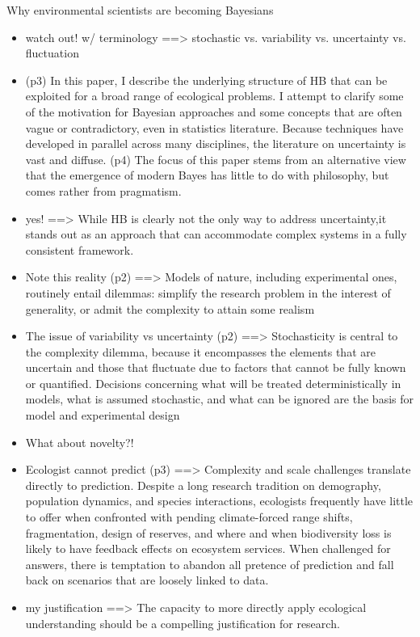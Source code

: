 \documentclass[twoside]{article}	                         %
\begin{document}
\noindent \citep{clark_why_2005} Why environmental scientists are becoming Bayesians
\begin{itemize}
  \item watch out! w/ terminology ==> stochastic vs. variability vs. uncertainty vs. fluctuation
  \item (p3) In this paper, I describe the underlying structure of HB that can be exploited for a broad range of ecological problems. I attempt to clarify some of the motivation for Bayesian approaches and some concepts that are often vague or contradictory, even in statistics literature. Because techniques have developed in parallel across many disciplines, the literature on uncertainty is vast and diffuse. (p4) The focus of this paper stems from an alternative view that the emergence of modern Bayes has little to do with philosophy, but comes rather from pragmatism.   
  \item yes! ==> While HB is clearly not the only way to address uncertainty,it stands out as an approach that can accommodate complex systems in a fully consistent framework.
  \item Note this reality (p2) ==> Models of nature, including experimental ones, routinely entail dilemmas: simplify the research problem in the interest of generality, or admit the complexity to attain some realism
  \item  The issue  of variability vs uncertainty (p2) ==> Stochasticity is central to the complexity dilemma, because it encompasses the elements that are uncertain and those that fluctuate due to factors that cannot be fully known or quantified. Decisions concerning what will be treated deterministically in models, what is assumed stochastic, and what can be ignored are the basis for model and experimental design
  \item What about novelty?!
  \item Ecologist cannot predict (p3) ==> Complexity and scale challenges translate directly to prediction. Despite a long research tradition on demography, population dynamics, and species interactions, ecologists frequently have little to offer when confronted with pending climate-forced range shifts, fragmentation, design of reserves, and where and when biodiversity loss is likely to have feedback effects on ecosystem services. When challenged for answers, there is temptation to abandon all pretence of prediction and fall back on scenarios that are loosely linked to data.
  \item  my justification ==> The capacity to more directly apply ecological understanding should be a compelling justification for research. 

\end{itemize}
\end{document}
